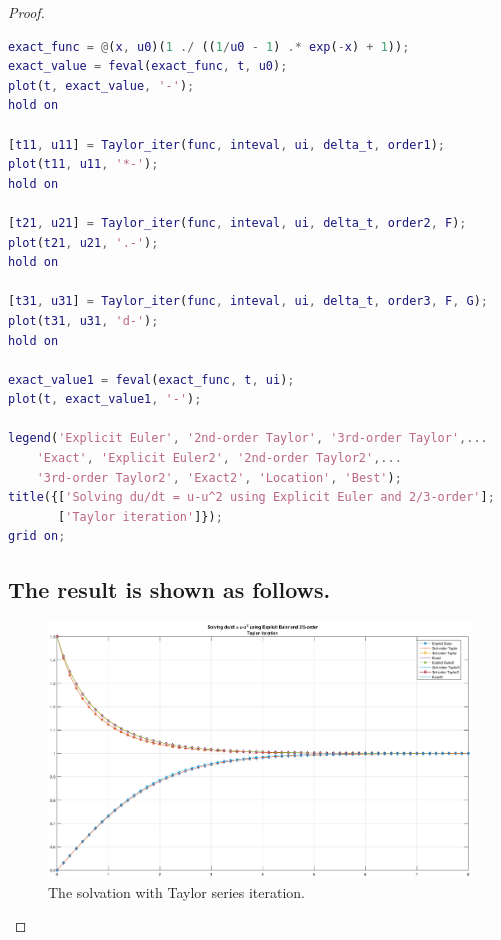 \documentclass{article}
\begin{document}
\begin{proof}
\begin{lstlisting}[language={MATLAB}]
exact_func = @(x, u0)(1 ./ ((1/u0 - 1) .* exp(-x) + 1));
exact_value = feval(exact_func, t, u0);
plot(t, exact_value, '-');
hold on

[t11, u11] = Taylor_iter(func, inteval, ui, delta_t, order1);
plot(t11, u11, '*-');
hold on

[t21, u21] = Taylor_iter(func, inteval, ui, delta_t, order2, F);
plot(t21, u21, '.-');
hold on

[t31, u31] = Taylor_iter(func, inteval, ui, delta_t, order3, F, G);
plot(t31, u31, 'd-');
hold on

exact_value1 = feval(exact_func, t, ui);
plot(t, exact_value1, '-');

legend('Explicit Euler', '2nd-order Taylor', '3rd-order Taylor',...
    'Exact', 'Explicit Euler2', '2nd-order Taylor2',...
    '3rd-order Taylor2', 'Exact2', 'Location', 'Best');
title({['Solving du/dt = u-u^2 using Explicit Euler and 2/3-order'];
       ['Taylor iteration']});
grid on;
\end{lstlisting}

\subsection{The result is shown as follows.}
\begin{figure}[htbp]
\centering
\includegraphics[width = 15cm]{solve.eps}
\caption{The solvation with Taylor series iteration.}
\label{Solve}
\end{figure}
\end{proof}
\end{document}
